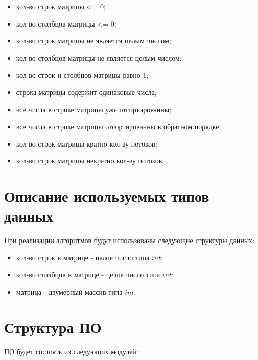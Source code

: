 \documentclass[a4paper,14pt, unknownkeysallowed]{extreport}
\begin{document}
\begin{itemize}
	\item кол-во строк матрицы <= 0;
	\item кол-во столбцов матрицы <= 0;
	\item кол-во строк матрицы не является целым числом;
	\item кол-во столбцов матрицы не является целым числом;
	\item кол-во строк и столбцов матрицы равно 1;
	\item строка матрицы содержит одинаковые числа;
	\item все числа в строке матрицы уже отсортированны;
	\item все числа в строке матрицы отсортированны в обратном порядке;
	\item кол-во строк матрицы кратно кол-ву потоков;
	\item кол-во строк матрицы некратно кол-ву потоков.
\end{itemize}

\section{Описание используемых типов данных}

При реализации алгоритмов будут использованы следующие структуры данных:

\begin{itemize}
	\item кол-во строк в матрице - целое число типа $int$;
	\item кол-во столбцов в матрице - целое число типа $int$;
	\item матрица - двумерный массив типа $int$.
\end{itemize}

\clearpage

\section{Структура ПО}

ПО будет состоять из следующих модулей:
\end{document}
